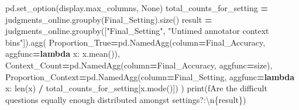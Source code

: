 \documentclass[
]{article}
\newenvironment{Shaded}{\begin{snugshade}}{\end{snugshade}}
\newcommand{\BuiltInTok}[1]{#1}
\newcommand{\CharTok}[1]{\textcolor[rgb]{0.31,0.60,0.02}{#1}}
\newcommand{\KeywordTok}[1]{\textcolor[rgb]{0.13,0.29,0.53}{\textbf{#1}}}
\newcommand{\NormalTok}[1]{#1}
\newcommand{\OperatorTok}[1]{\textcolor[rgb]{0.81,0.36,0.00}{\textbf{#1}}}
\newcommand{\SpecialCharTok}[1]{\textcolor[rgb]{0.00,0.00,0.00}{#1}}
\newcommand{\SpecialStringTok}[1]{\textcolor[rgb]{0.31,0.60,0.02}{#1}}
\newcommand{\StringTok}[1]{\textcolor[rgb]{0.31,0.60,0.02}{#1}}
\newcommand{\VariableTok}[1]{\textcolor[rgb]{0.00,0.00,0.00}{#1}}
\begin{document}
\begin{Shaded}
\begin{Highlighting}[]
\NormalTok{pd.set\_option(}\StringTok{\textquotesingle{}display.max\_columns\textquotesingle{}}\NormalTok{, }\VariableTok{None}\NormalTok{)}
\NormalTok{total\_counts\_for\_setting }\OperatorTok{=}\NormalTok{ judgments\_online.groupby(}\StringTok{\textquotesingle{}Final\_Setting\textquotesingle{}}\NormalTok{).size()}
\NormalTok{result }\OperatorTok{=}\NormalTok{ judgments\_online.groupby([}\StringTok{"Final\_Setting"}\NormalTok{, }\StringTok{"Untimed annotator context bins"}\NormalTok{]).agg(}
\NormalTok{    Proportion\_True}\OperatorTok{=}\NormalTok{pd.NamedAgg(column}\OperatorTok{=}\StringTok{\textquotesingle{}Final\_Accuracy\textquotesingle{}}\NormalTok{, aggfunc}\OperatorTok{=}\KeywordTok{lambda}\NormalTok{ x: x.mean()),}
\NormalTok{    Context\_Count}\OperatorTok{=}\NormalTok{pd.NamedAgg(column}\OperatorTok{=}\StringTok{\textquotesingle{}Final\_Accuracy\textquotesingle{}}\NormalTok{, aggfunc}\OperatorTok{=}\StringTok{\textquotesingle{}size\textquotesingle{}}\NormalTok{),}
\NormalTok{    Proportion\_Context}\OperatorTok{=}\NormalTok{pd.NamedAgg(column}\OperatorTok{=}\StringTok{\textquotesingle{}Final\_Setting\textquotesingle{}}\NormalTok{, aggfunc}\OperatorTok{=}\KeywordTok{lambda}\NormalTok{ x: }\BuiltInTok{len}\NormalTok{(x) }\OperatorTok{/}\NormalTok{ total\_counts\_for\_setting[x.mode()])}
\NormalTok{)}
\BuiltInTok{print}\NormalTok{(}\SpecialStringTok{f\textquotesingle{}Are the difficult questions equally enough distributed amongst settings?:}\CharTok{\textbackslash{}n}\SpecialCharTok{\{}\NormalTok{result}\SpecialCharTok{\}}\SpecialStringTok{\textquotesingle{}}\NormalTok{)}
\end{Highlighting}
\end{Shaded}
\end{document}
